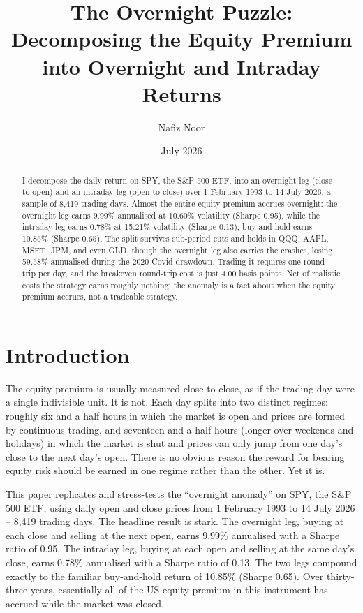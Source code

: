 \documentclass[11pt]{article}
\title{The Overnight Puzzle: Decomposing the Equity Premium into Overnight and Intraday Returns}
\author{Nafiz Noor}
\date{July 2026}
\begin{document}
\maketitle

\begin{abstract}
\noindent
I decompose the daily return on SPY, the S\&P 500 ETF, into an overnight leg (close to open) and an intraday leg (open to close) over 1 February 1993 to 14 July 2026, a sample of 8,419 trading days. Almost the entire equity premium accrues overnight: the overnight leg earns 9.99\% annualised at 10.60\% volatility (Sharpe 0.95), while the intraday leg earns 0.78\% at 15.21\% volatility (Sharpe 0.13); buy-and-hold earns 10.85\% (Sharpe 0.65). The split survives sub-period cuts and holds in QQQ, AAPL, MSFT, JPM, and even GLD, though the overnight leg also carries the crashes, losing 59.58\% annualised during the 2020 Covid drawdown. Trading it requires one round trip per day, and the breakeven round-trip cost is just 4.00 basis points. Net of realistic costs the strategy earns roughly nothing: the anomaly is a fact about when the equity premium accrues, not a tradeable strategy.
\end{abstract}

\section{Introduction}

The equity premium is usually measured close to close, as if the trading day were a single indivisible unit. It is not. Each day splits into two distinct regimes: roughly six and a half hours in which the market is open and prices are formed by continuous trading, and seventeen and a half hours (longer over weekends and holidays) in which the market is shut and prices can only jump from one day's close to the next day's open. There is no obvious reason the reward for bearing equity risk should be earned in one regime rather than the other. Yet it is.

This paper replicates and stress-tests the ``overnight anomaly'' on SPY, the S\&P 500 ETF, using daily open and close prices from 1 February 1993 to 14 July 2026 -- 8,419 trading days. The headline result is stark. The overnight leg, buying at each close and selling at the next open, earns 9.99\% annualised with a Sharpe ratio of 0.95. The intraday leg, buying at each open and selling at the same day's close, earns 0.78\% annualised with a Sharpe ratio of 0.13. The two legs compound exactly to the familiar buy-and-hold return of 10.85\% (Sharpe 0.65). Over thirty-three years, essentially all of the US equity premium in this instrument has accrued while the market was closed.
\end{document}
